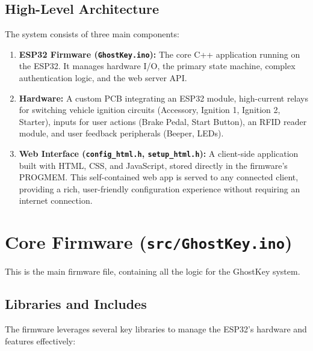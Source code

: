 \documentclass{article}
\begin{document}
\subsection{High-Level Architecture}
The system consists of three main components:
\begin{enumerate}
    \item \textbf{ESP32 Firmware (\texttt{GhostKey.ino}):} The core C++ application running on the ESP32. It manages hardware I/O, the primary state machine, complex authentication logic, and the web server API.
    \item \textbf{Hardware:} A custom PCB integrating an ESP32 module, high-current relays for switching vehicle ignition circuits (Accessory, Ignition 1, Ignition 2, Starter), inputs for user actions (Brake Pedal, Start Button), an RFID reader module, and user feedback peripherals (Beeper, LEDs).
    \item \textbf{Web Interface (\texttt{config\_html.h}, \texttt{setup\_html.h}):} A client-side application built with HTML, CSS, and JavaScript, stored directly in the firmware's PROGMEM. This self-contained web app is served to any connected client, providing a rich, user-friendly configuration experience without requiring an internet connection.
\end{enumerate}

\section{Core Firmware (\texttt{src/GhostKey.ino})}
This is the main firmware file, containing all the logic for the GhostKey system.

\subsection{Libraries and Includes}
The firmware leverages several key libraries to manage the ESP32's hardware and features effectively:
\end{document}

